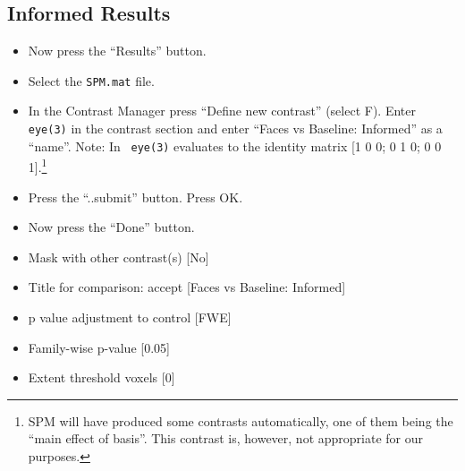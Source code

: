 \subsection{Informed Results}

\begin{itemize}
\item Now press the ``Results'' button.
\item Select the \texttt{SPM.mat} file.
\item In the Contrast Manager press ``Define new contrast'' (select F). Enter \texttt{eye(3)} in the contrast section and enter ``Faces vs Baseline: Informed'' as a ``name''. Note: In \matlab\ \texttt{eye(3)} evaluates to the identity matrix [1 0 0; 0 1 0; 0 0 1].\footnote{SPM will have produced some contrasts automatically, one of them being the ``main effect of basis''. This contrast is, however, not appropriate for our purposes.}
\item Press the ``..submit'' button. Press OK.
\item Now press the ``Done'' button.
\item Mask with other contrast(s) [No]
\item Title for comparison: accept [Faces vs Baseline: Informed]
\item p value adjustment to control [FWE]
\item Family-wise p-value [0.05]
\item Extent threshold {voxels} [0]
\end{itemize}

